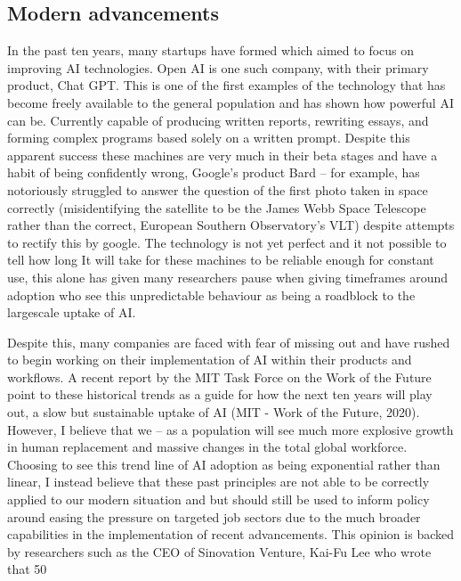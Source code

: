 \subsection{Modern advancements}
In the past ten years, many startups have formed which aimed to focus on improving AI technologies. Open AI is one such company, with their primary product, Chat GPT. This is one of the first examples of the technology that has become freely available to the general population and has shown how powerful AI can be. Currently capable of producing written reports, rewriting essays, and forming complex programs based solely on a written prompt. Despite this apparent success these machines are very much in their beta stages and have a habit of being confidently wrong, Google’s product Bard – for example, has notoriously struggled to answer the question of the first photo taken in space correctly (misidentifying the satellite to be the James Webb Space Telescope rather than the correct, European Southern Observatory’s VLT) despite attempts to rectify this by google. The technology is not yet perfect and it not possible to tell how long It will take for these machines to be reliable enough for constant use, this alone has given many researchers pause when giving timeframes around adoption who see this unpredictable behaviour as being a roadblock to the largescale uptake of AI.

Despite this, many companies are faced with fear of missing out and have rushed to begin working on their implementation of AI within their products and workflows. A recent report by the MIT Task Force on the Work of the Future point to these historical trends as a guide for how the next ten years will play out, a slow but sustainable uptake of AI (MIT - Work of the Future, 2020). However, I believe that we – as a population will see much more explosive growth in human replacement and massive changes in the total global workforce. Choosing to see this trend line of AI adoption as being exponential rather than linear, I instead believe that these past principles are not able to be correctly applied to our modern situation and but should still be used to inform policy around easing the pressure on targeted job sectors due to the much broader capabilities in the implementation of recent advancements. This opinion is backed by researchers such as the CEO of Sinovation Venture, Kai-Fu Lee who wrote that 50%

